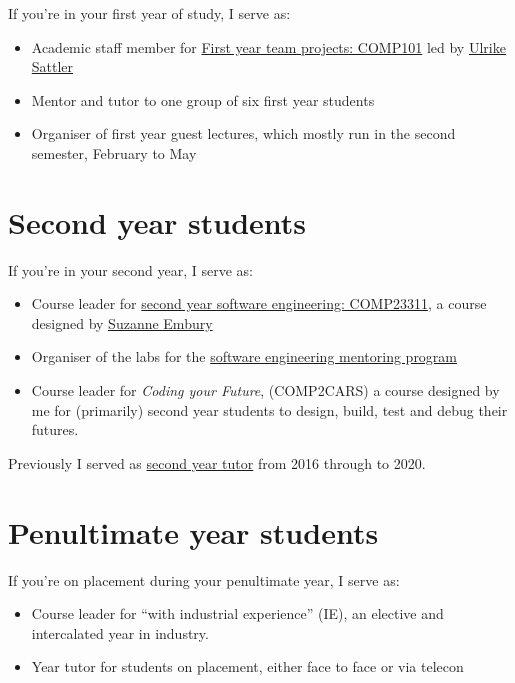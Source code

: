 \documentclass[
  12pt,
]{book}
\providecommand{\tightlist}{%
  \setlength{\itemsep}{0pt}\setlength{\parskip}{0pt}}
\begin{document}
If you're in your first year of study, I serve as:

\begin{itemize}
\tightlist
\item
  Academic staff member for \href{https://studentnet.cs.manchester.ac.uk/ugt/COMP10120/syllabus/}{First year team projects: COMP101} led by \href{http://www.cs.man.ac.uk/~sattler/}{Ulrike Sattler} \citep{COMP10120}
\item
  Mentor and tutor to one group of six first year students
\item
  Organiser of first year guest lectures, which mostly run in the second semester, February to May
\end{itemize}

\hypertarget{year2}{%
\section{Second year students}\label{year2}}

If you're in your second year, I serve as:

\begin{itemize}
\tightlist
\item
  Course leader for \href{https://studentnet.cs.manchester.ac.uk/ugt/COMP23311/syllabus/}{second year software engineering: COMP23311}, a course designed by \href{http://www.cs.man.ac.uk/~embury/}{Suzanne Embury} \citep{COMP23311, git}
\item
  Organiser of the labs for the \href{https://www.cs.manchester.ac.uk/connect/business-engagement/industrial-mentoring/}{software engineering mentoring program}
\item
  Course leader for \emph{Coding your Future}, (COMP2CARS) a course designed by me for (primarily) second year students to design, build, test and debug their futures.
\end{itemize}

Previously I served as \href{https://studentnet.cs.manchester.ac.uk/ugt/year2/}{second year tutor} from 2016 through to 2020.

\hypertarget{penultimate}{%
\section{Penultimate year students}\label{penultimate}}

If you're on placement during your penultimate year, I serve as:

\begin{itemize}
\tightlist
\item
  Course leader for ``with industrial experience'' (IE), an elective and intercalated year in industry.
\item
  Year tutor for students on placement, either face to face or via telecon
\end{itemize}
\end{document}
